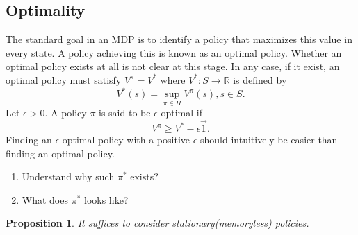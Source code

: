 \documentclass{report}
\newtheorem{proposition}{Proposition}[theorem]
\begin{document}
\subsection{Optimality}
The standard goal in an MDP is to identify a policy that maximizes this value in every state. A policy achieving this is known as an optimal policy. Whether an optimal policy exists at all is not clear at this stage. In any case, if it exist, an optimal policy must satisfy $V^{\pi}=V^*$ where $V^*:S\rightarrow \mathbb{R}$ is defined by \[
V^*(s)=\sup_{\pi \in \Pi}V^{\pi}(s),s\in S.  
\]
Let $\epsilon>0$. A policy $\pi$ is said to be $\epsilon$-optimal if \[
V^{\pi} \geq V^*-\epsilon\Vec{1}.
\]
Finding an $\epsilon$-optimal policy with a positive $\epsilon$ should intuitively be easier than finding an optimal policy.
\begin{enumerate}
    \item Understand why such $\pi^*$ exists?
    \item What does $\pi^*$ looks like?
\end{enumerate}
\begin{proposition}
It suffices to consider stationary(memoryless) policies.
\end{proposition}
\end{document}
